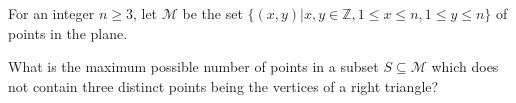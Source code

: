 For an integer $n \geq 3$,  let $\mathcal M$ be the set $\{(x, y) | x, y \in \mathbb Z, 1 \leq  x \leq  n, 1 \leq  y \leq  n\}$ of points in the plane.

What is the maximum possible number of points in a subset $S \subseteq \mathcal M$ which does not contain three distinct points being the vertices of a right triangle?